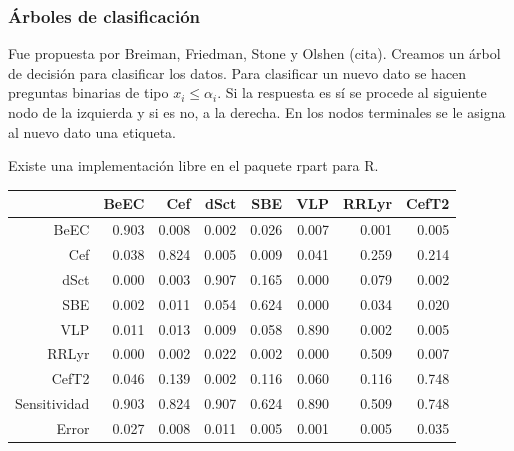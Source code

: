 \documentclass{beamer}
\begin{document}
\begin{frame}
  \frametitle{Árboles de clasificación}
  Fue propuesta por Breiman, Friedman, Stone y Olshen (cita). Creamos un árbol de decisión para clasificar los datos. Para clasificar un nuevo dato se hacen preguntas binarias de tipo $x_i\leq \alpha_i$. Si la respuesta es sí se procede al siguiente nodo de la izquierda y si es no,  a la derecha. En los nodos terminales se le asigna al nuevo dato una etiqueta. 
  
  Existe una implementación libre en el paquete rpart para R.


  \begin{table}[ht]
    \centering
    \resizebox{0.7\textwidth}{!} {
      \begin{tabular}{rrrrrrrr}
        \hline
        & BeEC & Cef & dSct & SBE & VLP & RRLyr & CefT2 \\ 
        \hline
        BeEC & 0.903 & 0.008 & 0.002 & 0.026 & 0.007 & 0.001 & 0.005 \\ 
        Cef & 0.038 & 0.824 & 0.005 & 0.009 & 0.041 & 0.259 & 0.214 \\ 
        dSct & 0.000 & 0.003 & 0.907 & 0.165 & 0.000 & 0.079 & 0.002 \\ 
        SBE & 0.002 & 0.011 & 0.054 & 0.624 & 0.000 & 0.034 & 0.020 \\ 
        VLP & 0.011 & 0.013 & 0.009 & 0.058 & 0.890 & 0.002 & 0.005 \\ 
        RRLyr & 0.000 & 0.002 & 0.022 & 0.002 & 0.000 & 0.509 & 0.007 \\ 
        CefT2 & 0.046 & 0.139 & 0.002 & 0.116 & 0.060 & 0.116 & 0.748 \\ 
        \hline
        \hline
        Sensitividad & 0.903 & 0.824 & 0.907 & 0.624 & 0.890 & 0.509 & 0.748 \\ 
        \hline
        Error & 0.027 & 0.008 & 0.011 & 0.005 & 0.001 & 0.005 & 0.035 \\ 
        \hline
        \hline
      \end{tabular}
    }
  \end{table}
\end{frame}
\end{document}

